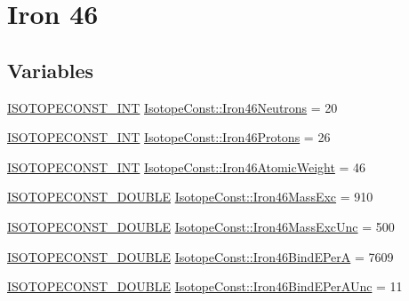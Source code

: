 \hypertarget{group___isotope_const-_iron-_fe46}{}\section{Iron 46}
\label{group___isotope_const-_iron-_fe46}
\subsection*{Variables}
\begin{DoxyCompactItemize}
\item 
\mbox{\hyperlink{group___isotope_const-_macros_ga5f18360b3e99483a35c32d789e62621c}{I\+S\+O\+T\+O\+P\+E\+C\+O\+N\+S\+T\+\_\+\+I\+NT}} \mbox{\hyperlink{group___isotope_const-_iron-_fe46_ga152353a44b009a73643d2a928af6af60}{Isotope\+Const\+::\+Iron46\+Neutrons}} = 20
\item 
\mbox{\hyperlink{group___isotope_const-_macros_ga5f18360b3e99483a35c32d789e62621c}{I\+S\+O\+T\+O\+P\+E\+C\+O\+N\+S\+T\+\_\+\+I\+NT}} \mbox{\hyperlink{group___isotope_const-_iron-_fe46_ga31698ea184af403580fe9b990fb15945}{Isotope\+Const\+::\+Iron46\+Protons}} = 26
\item 
\mbox{\hyperlink{group___isotope_const-_macros_ga5f18360b3e99483a35c32d789e62621c}{I\+S\+O\+T\+O\+P\+E\+C\+O\+N\+S\+T\+\_\+\+I\+NT}} \mbox{\hyperlink{group___isotope_const-_iron-_fe46_ga3be6e409668b4c27234dcdfc02b5ae5d}{Isotope\+Const\+::\+Iron46\+Atomic\+Weight}} = 46
\item 
\mbox{\hyperlink{group___isotope_const-_macros_ga8f45a7272ce02c0b4c65c44636ed719a}{I\+S\+O\+T\+O\+P\+E\+C\+O\+N\+S\+T\+\_\+\+D\+O\+U\+B\+LE}} \mbox{\hyperlink{group___isotope_const-_iron-_fe46_ga274eff4ba7e101920f9e44125f1fd686}{Isotope\+Const\+::\+Iron46\+Mass\+Exc}} = 910
\item 
\mbox{\hyperlink{group___isotope_const-_macros_ga8f45a7272ce02c0b4c65c44636ed719a}{I\+S\+O\+T\+O\+P\+E\+C\+O\+N\+S\+T\+\_\+\+D\+O\+U\+B\+LE}} \mbox{\hyperlink{group___isotope_const-_iron-_fe46_ga6873ee3056cd7a050402e5da3864e7ec}{Isotope\+Const\+::\+Iron46\+Mass\+Exc\+Unc}} = 500
\item 
\mbox{\hyperlink{group___isotope_const-_macros_ga8f45a7272ce02c0b4c65c44636ed719a}{I\+S\+O\+T\+O\+P\+E\+C\+O\+N\+S\+T\+\_\+\+D\+O\+U\+B\+LE}} \mbox{\hyperlink{group___isotope_const-_iron-_fe46_ga6c386fbddb35a388991dd129ea5bf15a}{Isotope\+Const\+::\+Iron46\+Bind\+E\+PerA}} = 7609
\item 
\mbox{\hyperlink{group___isotope_const-_macros_ga8f45a7272ce02c0b4c65c44636ed719a}{I\+S\+O\+T\+O\+P\+E\+C\+O\+N\+S\+T\+\_\+\+D\+O\+U\+B\+LE}} \mbox{\hyperlink{group___isotope_const-_iron-_fe46_ga259756193ee63a1c45d5dcf620c72899}{Isotope\+Const\+::\+Iron46\+Bind\+E\+Per\+A\+Unc}} = 11

\end{DoxyCompactItemize}
